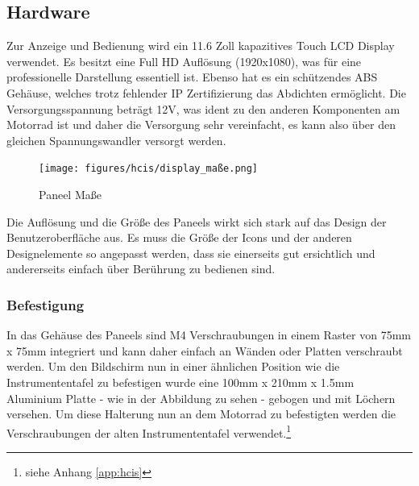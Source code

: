 \subsection{Hardware}

Zur Anzeige und Bedienung wird ein 11.6 Zoll kapazitives Touch LCD Display verwendet. Es besitzt eine Full HD Auflösung (1920x1080), was für eine professionelle Darstellung essentiell ist. Ebenso hat es ein schützendes ABS Gehäuse, welches trotz fehlender IP Zertifizierung das Abdichten ermöglicht. Die Versorgungsspannung beträgt 12V, was ident zu den anderen Komponenten am Motorrad ist und daher die Versorgung sehr vereinfacht, es kann also über den gleichen Spannungswandler versorgt werden.

\begin{figure}[H]
	\begin{center}
		\texttt{[image: figures/hcis/display\_maße.png]}
		\caption{Paneel Maße}
		\label{fig:panel}
	\end{center}
\end{figure}

Die Auflösung und die Größe des Paneels wirkt sich stark auf das Design der Benutzeroberfläche aus. Es muss die Größe der Icons und der anderen Designelemente so angepasst werden, dass sie einerseits gut ersichtlich und andererseits einfach über Berührung zu bedienen sind.\\

\newpage

\subsubsection{Befestigung}
In das Gehäuse des Paneels sind M4 Verschraubungen in einem Raster von 75mm x 75mm integriert und kann daher einfach an Wänden oder Platten verschraubt werden. Um den Bildschirm nun in einer ähnlichen Position wie die Instrumententafel zu befestigen wurde eine 100mm x 210mm x 1.5mm Aluminium Platte - wie in der Abbildung zu sehen - gebogen und mit Löchern versehen. Um diese Halterung nun an dem Motorrad zu befestigten werden die Verschraubungen der alten Instrumententafel verwendet.\footnote{siehe Anhang \ref{app:hcis}}

